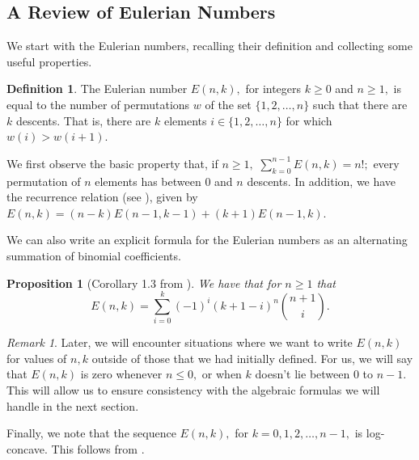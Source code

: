 \documentclass{article}
\newtheorem{prop}[thm]{Proposition}
\theoremstyle{definition}
\newtheorem{defn}[thm]{Definition}
\theoremstyle{remark}
\newtheorem*{rmk}{Remark}
\begin{document}
\subsection{A Review of Eulerian Numbers}
\par We start with the Eulerian numbers, recalling their definition and collecting some useful properties.
\begin{defn}
The Eulerian number $E(n, k),$ for integers $k \geq 0$ and $n \geq 1,$ is equal to the number of permutations $w$ of the set $\{1, 2, \ldots, n\}$ such that there are $k$ descents. That is, there are $k$ elements $i \in \{1, 2, \ldots, n\}$ for which $w(i) > w(i+1).$ 
\end{defn}
\par We first observe the basic property that, if $n \geq 1,$ $\sum\limits_{k=0}^{n-1} E(n, k) = n!;$ every permutation of $n$ elements has between $0$ and $n$ descents. In addition, we have the recurrence relation (see \cite[Theorem 1.3]{eulerian}), given by $E(n, k) = (n-k)E(n-1, k-1) + (k+1)E(n-1, k).$
\par We can also write an explicit formula for the Eulerian numbers as an alternating summation of binomial coefficients.
\begin{prop}[Corollary 1.3 from \cite{eulerian}]\label{prop: alternating summation formula for Eulerian numbers}
We have that for $n \geq 1$ that \[E(n, k) = \sum\limits_{i=0}^k (-1)^i (k + 1 - i)^n \binom{n+1}{i}.\]
\end{prop}
\begin{rmk}
Later, we will encounter situations where we want to write $E(n, k)$ for values of $n, k$ outside of those that we had initially defined. For us, we will say that $E(n, k)$ is zero whenever $n \leq 0,$ or when $k$ doesn't lie between $0$ to $n-1.$ This will allow us to ensure consistency with the algebraic formulas we will handle in the next section.
\end{rmk}
Finally, we note that the sequence $E(n, k),$ for $k = 0, 1, 2, \ldots, n-1,$ is log-concave. This follows from \cite[Exercises 4.6, 4.8]{eulerian}.
\end{document}
